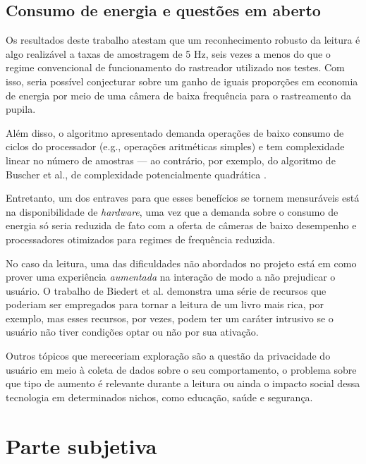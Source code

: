 \documentclass[12pt]{article}
\begin{document}
		\subsection{Consumo de energia e questões em aberto}
		Os resultados deste trabalho atestam que um reconhecimento robusto da leitura é algo realizável a taxas de amostragem de 5 Hz, seis vezes a menos do que o regime convencional de funcionamento do rastreador utilizado nos testes. Com isso, seria possível conjecturar sobre um ganho de iguais proporções em economia de energia por meio de uma câmera de baixa frequência para o rastreamento da pupila.
		
		Além disso, o algoritmo apresentado demanda operações de baixo consumo de ciclos do processador (e.g., operações aritméticas simples) e tem complexidade linear no número de amostras --- ao contrário, por exemplo, do algoritmo de Buscher et al., de complexidade potencialmente quadrática \cite{Buscher-2008}.
		
		Entretanto, um dos entraves para que esses benefícios se tornem mensuráveis está na disponibilidade de \textit{hardware}, uma vez que a demanda sobre o consumo de energia só seria reduzida de fato com a oferta de câmeras de baixo desempenho e processadores otimizados para regimes de frequência reduzida.
		
		No caso da leitura, uma das dificuldades não abordados no projeto está em como prover uma experiência \textit{aumentada} na interação de modo a não prejudicar o usuário. O trabalho de Biedert et al. \cite{Biedert-2010} demonstra uma série de recursos que poderiam ser empregados para tornar a leitura de um livro mais rica, por exemplo, mas esses recursos, por vezes, podem ter um caráter intrusivo se o usuário não tiver condições optar ou não por sua ativação.
		
		Outros tópicos que mereceriam exploração são a questão da privacidade do usuário em meio à coleta de dados sobre o seu comportamento, o problema sobre que tipo de aumento é relevante durante a leitura ou ainda o impacto social dessa tecnologia em determinados nichos, como educação, saúde e segurança.
		
		
		 
        \clearpage

	\section{Parte subjetiva}
	
\end{document}
